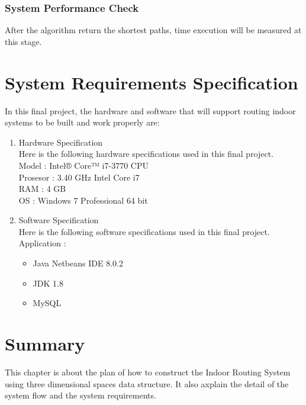 \vspace{60mm}
\subsubsection{System Performance Check}
After the algorithm return the shortest paths, time execution will be measured at this stage.

\section{System Requirements Specification}
In this final project, the hardware and software that will support routing indoor systems to be built and work properly are:

\begin{enumerate}
	\item Hardware Specification\\
		Here is the following hardware specifications used in this final project.\\
		Model 	: Intel® Core™ i7-3770 CPU\\
		Prosesor	: 3.40 GHz Intel Core i7\\
		RAM	: 4 GB\\
		OS		: Windows 7 Professional 64 bit

	\item Software Specification\\
Here is the following software specifications used in this final project.\\
Application	:
\begin{itemize}
	\item Java Netbeans IDE 8.0.2
	\item JDK 1.8
	\item MySQL
\end{itemize}
\end{enumerate}

\section{Summary}
This chapter is about the plan of how to construct the Indoor Routing System using three dimensional spaces data structure. It also axplain the detail of the system flow and the system requirements.